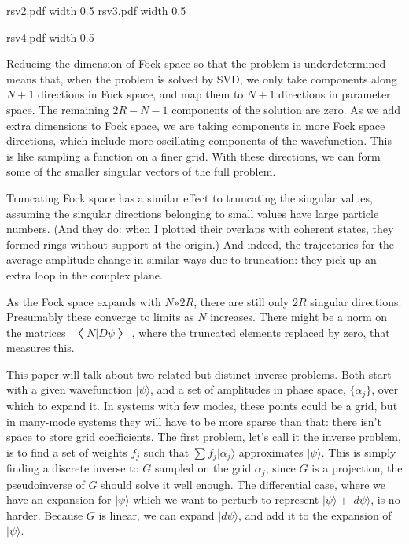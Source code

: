 \centerline{\XeTeXpicfile rsv2.pdf width 0.5\hsize
\XeTeXpicfile rsv3.pdf width 0.5\hsize}
\centerline{\XeTeXpicfile rsv4.pdf width 0.5\hsize}

Reducing the dimension of Fock space so that the problem is underdetermined means that, when the problem is solved by SVD, we only take components along $N+1$ directions in Fock space, and map them to $N+1$ directions in parameter space.  The remaining $2R-N-1$ components of the solution are zero.  As we add extra dimensions to Fock space, we are taking components in more Fock space directions, which include more oscillating components of the wavefunction.  This is like sampling a function on a finer grid.  With these directions, we can form some of the smaller singular vectors of the full problem.

Truncating Fock space has a similar effect to truncating the singular values, assuming the singular directions belonging to small values have large particle numbers.  (And they do: when I plotted their overlaps with coherent states, they formed rings without support at the origin.)  And indeed, the trajectories for the average amplitude change in similar ways due to truncation: they pick up an extra loop in the complex plane.

As the Fock space expands with $N»2R$, there are still only $2R$ singular directions.  Presumably these converge to limits as $N$ increases.  There might be a norm on the matrices $〈N|Dψ〉$, where the truncated elements replaced by zero, that measures this.


This paper will talk about two related but distinct inverse problems.  Both start with a given wavefunction $|ψ\rangle$, and a set of amplitudes in phase space, $\{α_j\}$, over which to expand it.  In systems with few modes, these points could be a grid, but in many-mode systems they will have to be more sparse than that: there isn't space to store grid coefficients.  The first problem, let's call it the inverse problem, is to find a set of weights $f_j$ such that $∑f_j|α_j\rangle$ approximates $|ψ\rangle$.  This is simply finding a discrete inverse to $G$ sampled on the grid $α_j$; since $G$ is a projection, the pseudoinverse of $G$ should solve it well enough.  The differential case, where we have an expansion for $|ψ\rangle$ which we want to perturb to represent $|ψ\rangle+|dψ\rangle$, is no harder.  Because $G$ is linear, we can expand $|dψ\rangle$, and add it to the expansion of $|ψ\rangle$.

